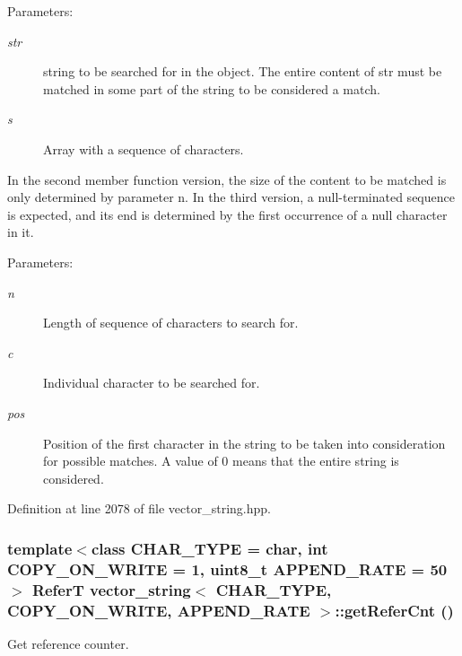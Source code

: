 \begin{Desc}
\item[Parameters:]
\begin{description}
\item[{\em str}]string to be searched for in the object. The entire content of str must be matched in some part of the string to be considered a match. \item[{\em s}]Array with a sequence of characters.\end{description}
\end{Desc}
In the second member function version, the size of the content to be matched is only determined by parameter n. In the third version, a null-terminated sequence is expected, and its end is determined by the first occurrence of a null character in it.

\begin{Desc}
\item[Parameters:]
\begin{description}
\item[{\em n}]Length of sequence of characters to search for. \item[{\em c}]Individual character to be searched for. \item[{\em pos}]Position of the first character in the string to be taken into consideration for possible matches. A value of 0 means that the entire string is considered. \end{description}
\end{Desc}


Definition at line 2078 of file vector\_\-string.hpp.\hypertarget{classvector__string_80e8d35e9a5ab1fc2443035e218374e8}{
\subsubsection[{getReferCnt}]{\setlength{\rightskip}{0pt plus 5cm}template$<$class CHAR\_\-TYPE  = char, int COPY\_\-ON\_\-WRITE = 1, uint8\_\-t APPEND\_\-RATE = 50$>$ ReferT {\bf vector\_\-string}$<$ CHAR\_\-TYPE, COPY\_\-ON\_\-WRITE, APPEND\_\-RATE $>$::getReferCnt ()}}
\label{classvector__string_80e8d35e9a5ab1fc2443035e218374e8}


Get reference counter. 

